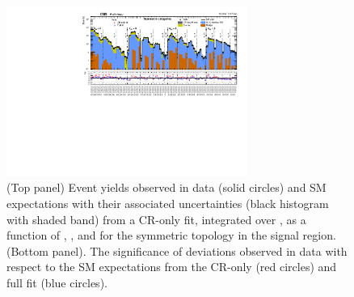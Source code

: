 \begin{figure}[!h]
  \begin{center}
    \includegraphics[angle=90,width=0.7\textwidth]{summaryPlot_Symmetric_prefit_overlay_fit_b}
    \caption{(Top panel) Event yields observed in data (solid circles)
      and SM expectations with their associated uncertainties (black
      histogram with shaded band) from a CR-only fit, integrated over
      \HTmiss, as a function of \njet, \nb, and \scalht for the
      symmetric topology in the signal region. (Bottom panel). The
      significance of deviations observed in data with respect to the
      SM expectations from the CR-only (red circles) and full fit
      (blue circles). }
    \label{fig:sym}
  \end{center}
\end{figure}

